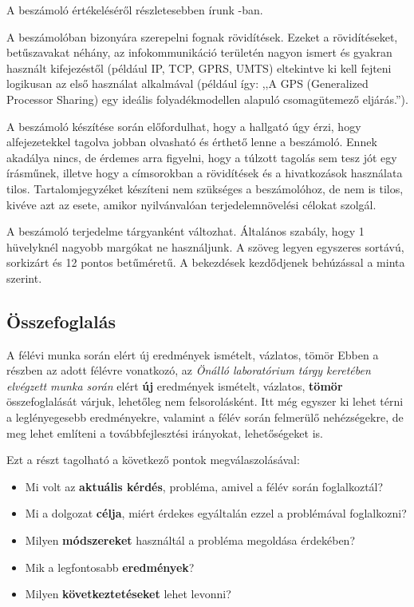 \documentclass[11pt,a4paper,oneside]{article}
\begin{document}
A beszámoló értékeléséről részletesebben írunk \cite{web}-ban.

A beszámolóban bizonyára szerepelni fognak rövidítések. Ezeket a
rövidítéseket, betűszavakat néhány, az infokommunikáció területén
nagyon ismert és gyakran használt kifejezéstől (például IP, TCP, GPRS,
UMTS) eltekintve ki kell fejteni logikusan az első használat
alkalmával (például így: ,,A GPS (Generalized Processor Sharing) egy
ideális folyadékmodellen alapuló csomagütemező eljárás.'').

A beszámoló készítése során előfordulhat, hogy a hallgató úgy érzi,
hogy alfejezetekkel tagolva jobban olvasható és érthető lenne a
beszámoló.  Ennek akadálya nincs, de érdemes arra figyelni, hogy a
túlzott tagolás sem tesz jót egy írásműnek, illetve hogy a címsorokban
a rövidítések és a hivatkozások használata tilos.  Tartalomjegyzéket
készíteni nem szükséges a beszámolóhoz, de nem is tilos, kivéve azt az
esete, amikor nyilvánvalóan terjedelemnövelési célokat szolgál.

A beszámoló terjedelme tárgyanként változhat.  Általános szabály, hogy
1 hüvelyknél nagyobb margókat ne használjunk.  A szöveg legyen
egyszeres sortávú, sorkizárt és 12 pontos betűméretű.  A bekezdések
kezdődjenek behúzással a minta szerint.

\subsection{Összefoglalás}
\label{sec:osszefoglalas}

A félévi munka során elért új eredmények ismételt, vázlatos, tömör
Ebben a részben az adott félévre vonatkozó, az \emph{Önálló
  laboratórium tárgy keretében elvégzett munka során} elért
\textbf{új} eredmények ismételt, vázlatos, \textbf{tömör}
összefoglalását várjuk, lehetőleg nem felsorolásként.  Itt még egyszer
ki lehet térni a leglényegesebb eredményekre, valamint a félév során
felmerülő nehézségekre, de meg lehet említeni a továbbfejlesztési
irányokat, lehetőségeket is.

Ezt a részt tagolható a következő pontok megválaszolásával:
\begin{itemize}
\item Mi volt az \textbf{aktuális kérdés}, probléma, amivel a félév
  során foglalkoztál?
\item Mi a dolgozat \textbf{célja}, miért érdekes egyáltalán ezzel a
  problémával foglalkozni?
\item Milyen \textbf{módszereket} használtál a probléma megoldása
  érdekében?
\item Mik a legfontosabb \textbf{eredmények}?
\item Milyen \textbf{következtetéseket} lehet levonni?

\end{itemize}
\end{document}
